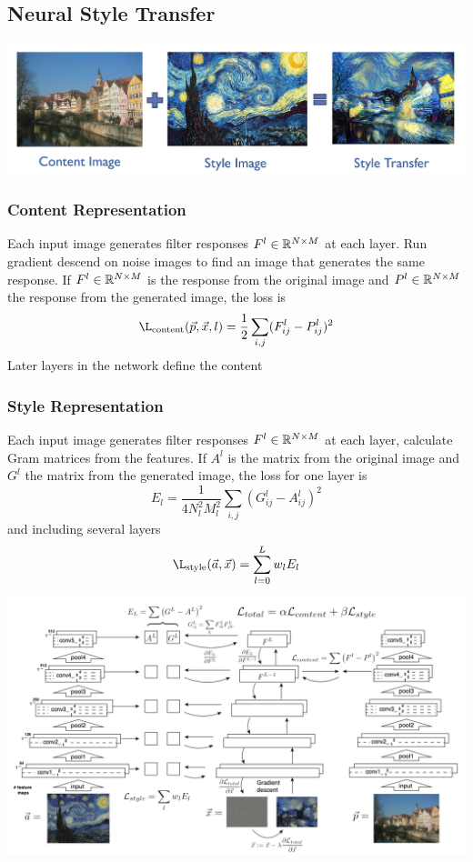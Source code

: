 \subsection{Neural Style Transfer}
\begin{center}
	\includegraphics[width=0.7\linewidth]{img/conditional_GAN_style_transfer}
\end{center}

\subsubsection{Content Representation}
Each input image generates filter responses $F^l \in \mathbb{R}^{N\times M}$ at each layer.
Run gradient descend on noise images to find an image that generates the same response.
If $F^l \in \mathbb{R}^{N\times M}$ is the response from the original image and $P^l \in \mathbb{R}^{N\times M}$ the response from the generated image, the loss is
\begin{equation*}
	\L_{\text{content}}(\vec{p},\vec{x},l) = \frac{1}{2} \sum_{i,j} (F_{ij}^l - P_{ij}^l)^2
\end{equation*}
Later layers in the network define the content

\subsubsection{Style Representation}
Each input image generates filter responses $F^l \in \mathbb{R}^{N\times M}$ at each layer, calculate Gram matrices from the features.
If $A^l$ is the matrix from the original  image and $G^l$ the matrix from the generated image, the loss for one layer is
\begin{equation*}
	E_l = \frac{1}{4 N_l^2 M_l^2}\sum_{i,j}(G_{ij}^l - A_{ij}^l)^2
\end{equation*}
and including several layers
\begin{equation*}
	\L_{\text{style}}(\vec{a},\vec{x}) = \sum_{l=0}^{L}w_l E_l
\end{equation*}

\begin{center}
	\includegraphics[width=0.8\linewidth]{img/conditional_GAN_style_representation.png}
\end{center}

